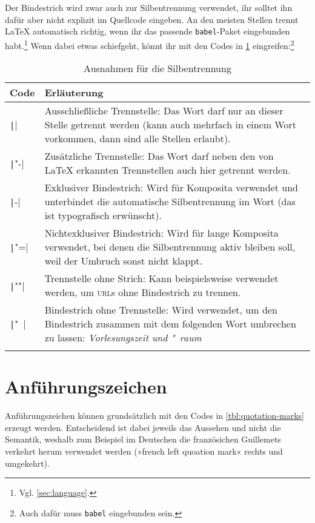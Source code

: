 Der Bindestrich wird zwar auch zur Silbentrennung verwendet, ihr solltet ihn dafür aber nicht explizit im Quellcode eingeben.
An den meisten Stellen trennt \LaTeX{} automatisch richtig, wenn ihr das passende \texttt{babel}-Paket eingebunden habt.\footnote{Vgl. \cref{sec:language}.}
Wenn dabei etwas schiefgeht, könnt ihr mit den Codes in \cref{tbl:separators} eingreifen:\footnote{Auch dafür muss \texttt{babel} eingebunden sein.}

\begin{longtable}{@{}lp{11cm}@{}}
	\toprule
	Code      & Erläuterung \\
	\midrule
	\endhead
	\texttt|\-| & Ausschließliche Trennstelle: Das Wort darf nur an dieser Stelle getrennt werden (kann auch mehrfach in einem Wort vorkommen, dann sind alle Stellen erlaubt). \\
	\texttt|"-| & Zusätzliche Trennstelle: Das Wort darf neben den von \LaTeX{} erkannten Trennstellen auch hier getrennt werden. \\
	\texttt|-|  & Exklusiver Bindestrich: Wird für Komposita verwendet und unterbindet die automatische Silbentrennung im Wort (das ist typografisch erwünscht). \\
	\texttt|"=| & Nichtexklusiver Bindestrich: Wird für lange Komposita verwendet, bei denen die Silbentrennung aktiv bleiben soll, weil der Umbruch sonst nicht klappt. \\
	\texttt|""| & Trennstelle ohne Strich: Kann beispielsweise verwendet werden, um \textsc{url}s ohne Bindestrich zu trennen. \\
	\texttt|"~| & Bindestrich ohne Trennstelle: Wird verwendet, um den Bindestrich zusammen mit dem folgenden Wort umbrechen zu lassen: \emph{Vorlesungszeit und "~raum} \\
	\bottomrule
	\caption{Ausnahmen für die Silbentrennung}
	\label{tbl:separators}
\end{longtable}

\section{Anführungszeichen}
Anführungszeichen können grundsätzlich mit den Codes in \cref{tbl:quotation-marks} erzeugt werden.
Entscheidend ist dabei jeweils das Aussehen und nicht die Semantik, weshalb zum Beispiel im Deutschen die französichen Guillemets verkehrt herum verwendet werden (»french left quoation mark« rechts und umgekehrt).

